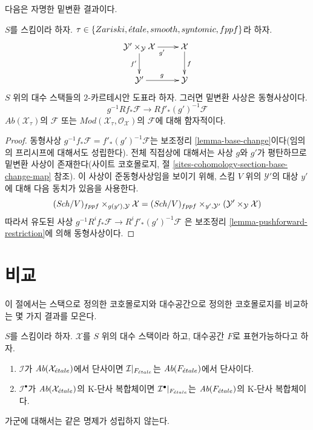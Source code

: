 \noindent
다음은 자명한 밑변환 결과이다.

\begin{lemma}
\label{lemma-base-change-higher-direct-images}
$S$를 스킴이라 하자.
$\tau \in \{Zariski,\linebreak[0] \etale,\linebreak[0]
smooth,\linebreak[0] syntomic,\linebreak[0] fppf\}$라 하자.
$$
\xymatrix{
\mathcal{Y}' \times_\mathcal{Y} \mathcal{X} \ar[r]_{g'} \ar[d]_{f'} &
\mathcal{X} \ar[d]^f \\
\mathcal{Y}' \ar[r]^g & \mathcal{Y}
}
$$
$S$ 위의 대수 스택들의 $2$-카르테시안 도표라 하자.
그러면 밑변환 사상은 동형사상이다.
$$
g^{-1}Rf_*\mathcal{F} \longrightarrow Rf'_*(g')^{-1}\mathcal{F}
$$
$\textit{Ab}(\mathcal{X}_\tau)$의 $\mathcal{F}$ 또는
$\textit{Mod}(\mathcal{X}_\tau, \mathcal{O}_\mathcal{X})$의
$\mathcal{F}$에 대해 함자적이다.
\end{lemma}

\begin{proof}
동형사상 $g^{-1}f_*\mathcal{F} = f'_*(g')^{-1}\mathcal{F}$는
보조정리 \ref{lemma-base-change}이다(임의의 프리시프에 대해서도
성립한다). 전체 직접상에 대해서는 사상 $g$와 $g'$가 평탄하므로
밑변환 사상이 존재한다(사이트 코호몰로지, 절
\ref{sites-cohomology-section-base-change-map} 참조).
이 사상이 준동형사상임을 보이기 위해, 스킴 $V$ 위의
$\mathcal{Y}'$의 대상 $y'$에 대해 다음 동치가 있음을 사용한다.
$$
(\mathit{Sch}/V)_{fppf} \times_{g(y'), \mathcal{Y}} \mathcal{X}
=
(\mathit{Sch}/V)_{fppf} \times_{y', \mathcal{Y}'}
(\mathcal{Y}' \times_\mathcal{Y} \mathcal{X})
$$
따라서 유도된 사상
$g^{-1}R^if_*\mathcal{F} \to R^if'_*(g')^{-1}\mathcal{F}$
은 보조정리 \ref{lemma-pushforward-restriction}에 의해 동형사상이다.
\end{proof}












\section{비교}
\label{section-compare}

\noindent
이 절에서는 스택으로 정의한 코호몰로지와 대수공간으로 정의한
코호몰로지를 비교하는 몇 가지 결과를 모은다.

\begin{lemma}
\label{lemma-compare-injectives}
$S$를 스킴이라 하자. $\mathcal{X}$를 $S$ 위의 대수 스택이라 하고,
대수공간 $F$로 표현가능하다고 하자.
\begin{enumerate}
\item $\mathcal{I}$가 $\textit{Ab}(\mathcal{X}_{\acute{e}tale})$에서 단사이면
$\mathcal{I}|_{F_{\acute{e}tale}}$는 $\textit{Ab}(F_{\acute{e}tale})$에서 단사이다.
\item $\mathcal{I}^\bullet$가 $\textit{Ab}(\mathcal{X}_{\acute{e}tale})$의
K-단사 복합체이면 $\mathcal{I}^\bullet|_{F_{\acute{e}tale}}$는
$\textit{Ab}(F_{\acute{e}tale})$의 K-단사 복합체이다.
\end{enumerate}
가군에 대해서는 같은 명제가 성립하지 않는다.
\end{lemma}

